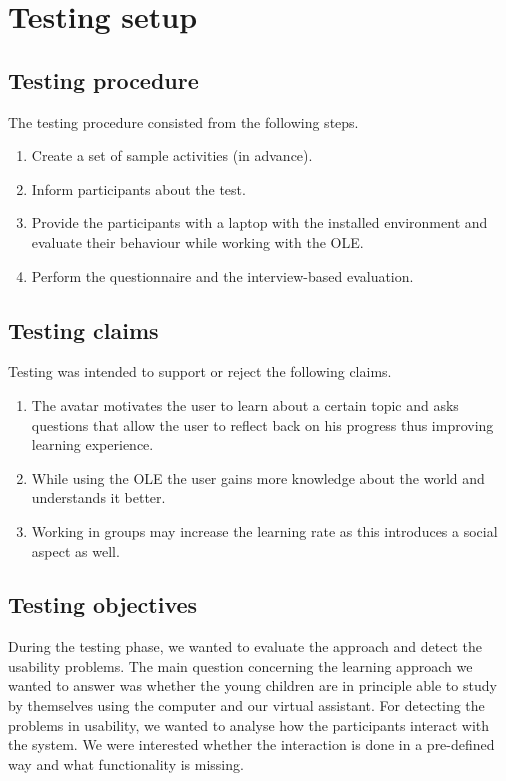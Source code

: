 \documentclass[a4paper]{article}
\begin{document}
\section{Testing setup}

\subsection{Testing procedure} 

The testing procedure consisted from the following steps.

\begin{enumerate}
	\item Create a set of sample activities (in advance).
	\item Inform participants about the test.
	\item Provide the participants with a laptop with the installed environment and evaluate their behaviour while working with the OLE.
	\item Perform the questionnaire and the interview-based evaluation.
\end{enumerate}

\subsection{Testing claims}

Testing was intended to support or reject the following claims.

\begin{enumerate}
	\item The avatar motivates the user to learn about a certain topic and asks questions that allow the user to reflect back on his progress thus improving learning experience.
	\item While using the OLE the user gains more knowledge about the world and understands it better. 
	\item Working in groups may increase the learning rate as this introduces a social aspect as well.
\end{enumerate}

\subsection{Testing objectives}

During the testing phase, we wanted to evaluate the approach and detect the usability problems. The main question concerning the learning approach we wanted to answer was whether the young children are in principle able to study by themselves using the computer and our virtual assistant. For detecting the problems in usability, we wanted to analyse how the participants interact with the system. We were interested whether the interaction is done in a pre-defined way and what functionality is missing.
\end{document}
